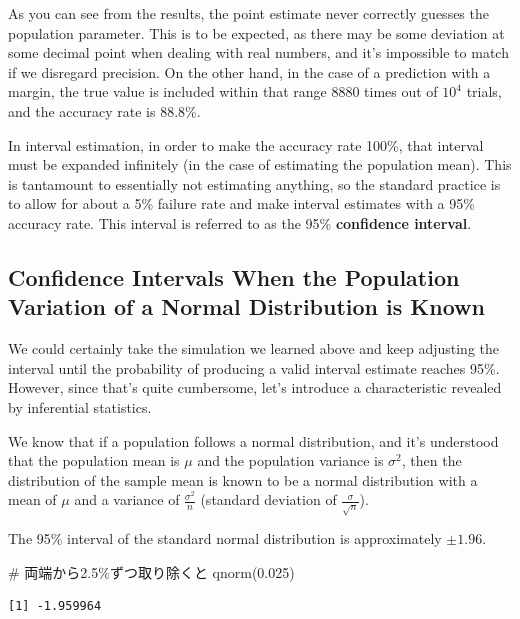 \documentclass[
  a4paper,
]{book}
\newenvironment{Shaded}{\begin{snugshade}}{\end{snugshade}}
\newcommand{\CommentTok}[1]{\textcolor[rgb]{0.37,0.37,0.37}{#1}}
\newcommand{\FloatTok}[1]{\textcolor[rgb]{0.68,0.00,0.00}{#1}}
\newcommand{\FunctionTok}[1]{\textcolor[rgb]{0.28,0.35,0.67}{#1}}
\newcommand{\NormalTok}[1]{\textcolor[rgb]{0.00,0.23,0.31}{#1}}
\begin{document}
As you can see from the results, the point estimate never correctly
guesses the population parameter. This is to be expected, as there may
be some deviation at some decimal point when dealing with real numbers,
and it's impossible to match if we disregard precision. On the other
hand, in the case of a prediction with a margin, the true value is
included within that range 8880 times out of \ensuremath{10^{4}} trials,
and the accuracy rate is 88.8\%.

In interval estimation, in order to make the accuracy rate 100\%, that
interval must be expanded infinitely (in the case of estimating the
population mean). This is tantamount to essentially not estimating
anything, so the standard practice is to allow for about a 5\% failure
rate and make interval estimates with a 95\% accuracy rate. This
interval is referred to as the 95\% \textbf{confidence interval}.

\subsection{Confidence Intervals When the Population Variation of a
Normal Distribution is
Known}\label{confidence-intervals-when-the-population-variation-of-a-normal-distribution-is-known}

We could certainly take the simulation we learned above and keep
adjusting the interval until the probability of producing a valid
interval estimate reaches 95\%. However, since that's quite cumbersome,
let's introduce a characteristic revealed by inferential statistics.

We know that if a population follows a normal distribution, and it's
understood that the population mean is \(\mu\) and the population
variance is \(\sigma^2\), then the distribution of the sample mean is
known to be a normal distribution with a mean of \(\mu\) and a variance
of \(\frac{\sigma^2}{n}\) (standard deviation of
\(\frac{\sigma}{\sqrt{n}}\)).

The 95\% interval of the standard normal distribution is approximately
\(\pm 1.96\).

\begin{Shaded}
\begin{Highlighting}[]
\CommentTok{\# 両端から2.5\%ずつ取り除くと}
\FunctionTok{qnorm}\NormalTok{(}\FloatTok{0.025}\NormalTok{)}
\end{Highlighting}
\end{Shaded}

\begin{verbatim}
[1] -1.959964
\end{verbatim}
\end{document}
